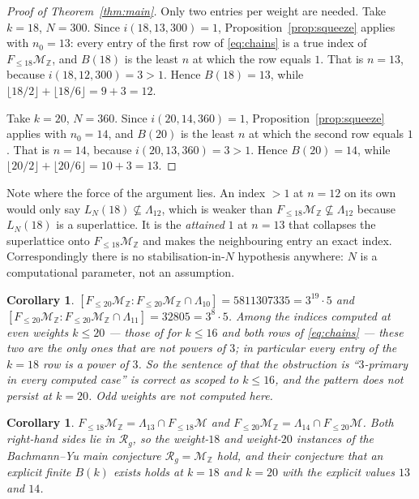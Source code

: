 \documentclass[11pt]{amsart}
\newtheorem{corollary}[theorem]{Corollary}
\theoremstyle{remark}
\newcommand{\Mm}{\mathcal M}
\newcommand{\MZ}{\mathcal M_{\mathbb Z}}
\newcommand{\Rg}{\mathcal R_g}
\newcommand{\Lam}{\Lambda}
\begin{document}
\begin{proof}[Proof of Theorem~\ref{thm:main}]
Only two entries per weight are needed. Take $k=18$, $N=300$. Since $i(18,13,300)=1$,
Proposition~\ref{prop:squeeze} applies with $n_0=13$: every entry of the first row of
\eqref{eq:chains} is a true index of $F_{\le18}\MZ$, and $B(18)$ is the least $n$ at which the row
equals $1$. That is $n=13$, because $i(18,12,300)=3>1$. Hence $B(18)=13$, while
$\lfloor18/2\rfloor+\lfloor18/6\rfloor=9+3=12$.

Take $k=20$, $N=360$. Since $i(20,14,360)=1$, Proposition~\ref{prop:squeeze} applies with
$n_0=14$, and $B(20)$ is the least $n$ at which the second row equals $1$. That is $n=14$, because
$i(20,13,360)=3>1$. Hence $B(20)=14$, while $\lfloor20/2\rfloor+\lfloor20/6\rfloor=10+3=13$.
\end{proof}

Note where the force of the argument lies. An index $>1$ at $n=12$ on its own would only say
$L_N(18)\not\subseteq\Lam_{12}$, which is weaker than
$F_{\le18}\MZ\not\subseteq\Lam_{12}$ because $L_N(18)$ is a superlattice. It is the
\emph{attained} $1$ at $n=13$ that collapses the superlattice onto $F_{\le18}\MZ$ and makes the
neighbouring entry an exact index. Correspondingly there is no stabilisation-in-$N$ hypothesis
anywhere: $N$ is a computational parameter, not an assumption.

\begin{corollary}\label{cor:five}
$[F_{\le20}\MZ:F_{\le20}\MZ\cap\Lam_{10}]=5811307335=3^{19}\cdot5$ and
$[F_{\le20}\MZ:F_{\le20}\MZ\cap\Lam_{11}]=32805=3^{8}\cdot5$. Among the indices computed at even
weights $k\le20$ --- those of \cite{BY} for $k\le16$ and both rows of \eqref{eq:chains} --- these
two are the only ones that are not powers of $3$; in particular every entry of the $k=18$ row is a
power of $3$. So the sentence of \cite{BY} that the obstruction is ``$3$-primary in every computed
case'' is correct as scoped to $k\le16$, and the pattern does not persist at $k=20$. Odd weights
are not computed here.
\end{corollary}

\begin{corollary}\label{cor:confirm}
$F_{\le18}\MZ=\Lam_{13}\cap F_{\le18}\Mm$ and $F_{\le20}\MZ=\Lam_{14}\cap F_{\le20}\Mm$. Both
right-hand sides lie in $\Rg$, so the weight-$18$ and weight-$20$ instances of the Bachmann--Yu
main conjecture $\Rg=\MZ$ hold, and their conjecture that an explicit finite $B(k)$ exists holds at
$k=18$ and $k=20$ with the explicit values $13$ and $14$.
\end{corollary}
\end{document}
